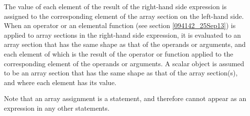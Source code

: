 

The value of each element of the result of the right-hand side expression is
assigned to the corresponding element of the array section on the
left-hand side.
%
When an operator or an elemental function (see section
\ref{094142_25Sep13}) is applied to array sections in the right-hand side
expression, it is evaluated to an array section that has the same shape
as that of the operands or arguments, and each element of which is the
result of the operator or function applied to the corresponding element
of the operands or arguments. A scalar object is assumed to be an array
section that has the same shape as that of the array section(s), and
where each element has its value.

Note that an array assignment is a statement, and therefore cannot
appear as an expression in any other statements.



